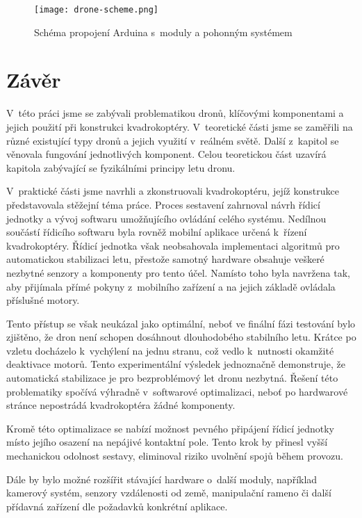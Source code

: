 \documentclass[12pt]{report}
\begin{document}
\vspace{40pt}
\begin{figure}[H]
	\centering
	\texttt{[image: drone-scheme.png]}
	\caption{Schéma propojení Arduina s~moduly a pohonným systémem \cite{fritzing}}
	\label{fig:drone-scheme.png}
\end{figure}

\chapter*{Závěr}
	
V~této práci jsme se zabývali problematikou dronů, klíčovými komponentami a jejich použití při konstrukci kvadrokoptéry. V~teoretické části jsme se zaměřili na různé existující typy dronů a jejich využití v~reálném světě. Další z~kapitol se věnovala fungování jednotlivých komponent. Celou teoretickou část uzavírá kapitola zabývající se fyzikálními principy letu dronu.

V~praktické části jsme navrhli a zkonstruovali kvadrokoptéru, jejíž konstrukce představovala stěžejní téma práce. Proces sestavení zahrnoval návrh řídicí jednotky a vývoj softwaru umožňujícího ovládání celého systému. Nedílnou součástí řídicího softwaru byla rovněž mobilní aplikace určená k~řízení kvadrokoptéry. Řídicí jednotka však neobsahovala implementaci algoritmů pro automatickou stabilizaci letu, přestože samotný hardware obsahuje veškeré nezbytné senzory a komponenty pro tento účel. Namísto toho byla navržena tak, aby přijímala přímé pokyny z~mobilního zařízení a na jejich základě ovládala příslušné motory.

Tento přístup se však neukázal jako optimální, neboť ve finální fázi testování bylo zjištěno, že dron není schopen dosáhnout dlouhodobého stabilního letu. Krátce po vzletu docházelo k~vychýlení na jednu stranu, což vedlo k~nutnosti okamžité deaktivace motorů. Tento experimentální výsledek jednoznačně demonstruje, že automatická stabilizace je pro bezproblémový let dronu nezbytná. Řešení této problematiky spočívá výhradně v~softwarové optimalizaci, neboť po hardwarové stránce nepostrádá kvadrokoptéra žádné komponenty.

Kromě této optimalizace se nabízí možnost pevného připájení řídicí jednotky místo jejího osazení na nepájivé kontaktní pole. Tento krok by přinesl vyšší mechanickou odolnost sestavy, eliminoval riziko uvolnění spojů během provozu.

Dále by bylo možné rozšířit stávající hardware o~další moduly, například kamerový systém, senzory vzdálenosti od země, manipulační rameno či další přídavná zařízení dle požadavků konkrétní aplikace.
	
\end{document}
